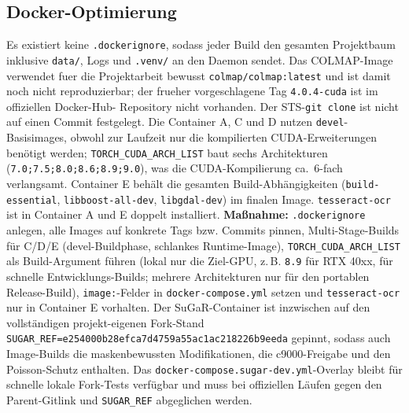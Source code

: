 \documentclass[12pt,a4paper]{article}
\begin{document}
\subsection{Docker-Optimierung}
Es existiert keine \texttt{.dockerignore}, sodass jeder Build den gesamten
Projektbaum inklusive \texttt{data/}, Logs und \texttt{.venv/} an den Daemon
sendet. Das COLMAP-Image verwendet fuer die Projektarbeit bewusst
\texttt{colmap/colmap:latest} und ist damit noch nicht reproduzierbar; der
frueher vorgeschlagene Tag \texttt{4.0.4-cuda} ist im offiziellen Docker-Hub-
Repository nicht vorhanden. Der STS-\texttt{git clone} ist nicht auf einen
Commit festgelegt. Die Container A, C und D nutzen \texttt{devel}-Basisimages, obwohl
zur Laufzeit nur die kompilierten CUDA-Erweiterungen benötigt werden;
\texttt{TORCH\_CUDA\_ARCH\_LIST} baut sechs Architekturen
(\texttt{7.0;7.5;8.0;8.6;8.9;9.0}), was die CUDA-Kompilierung ca.~6-fach
verlangsamt. Container E behält die gesamten Build-Abhängigkeiten
(\texttt{build-essential}, \texttt{libboost-all-dev}, \texttt{libgdal-dev}) im
finalen Image. \texttt{tesseract-ocr} ist in Container A und E doppelt
installiert. \textbf{Maßnahme:} \texttt{.dockerignore} anlegen, alle Images auf
konkrete Tags bzw. Commits pinnen, Multi-Stage-Builds für C/D/E (devel-Buildphase,
schlankes Runtime-Image), \texttt{TORCH\_CUDA\_ARCH\_LIST} als Build-Argument
führen (lokal nur die Ziel-GPU, z.\,B. \texttt{8.9} für RTX 40xx, für schnelle
Entwicklungs-Builds; mehrere Architekturen nur für den portablen Release-Build),
\texttt{image:}-Felder in \texttt{docker-compose.yml} setzen und
\texttt{tesseract-ocr} nur in Container E vorhalten. Der SuGaR-Container ist
inzwischen auf den vollständigen projekt-eigenen Fork-Stand
\texttt{SUGAR\_REF=e254000b28efca7d4759a55ac1ac218226b9eeda} gepinnt, sodass
auch Image-Builds die maskenbewussten Modifikationen, die c9000-Freigabe und
den Poisson-Schutz enthalten. Das
\texttt{docker-compose.sugar-dev.yml}-Overlay bleibt für schnelle lokale
Fork-Tests verfügbar und muss bei offiziellen Läufen gegen den Parent-Gitlink
und \texttt{SUGAR\_REF} abgeglichen werden.
\end{document}
